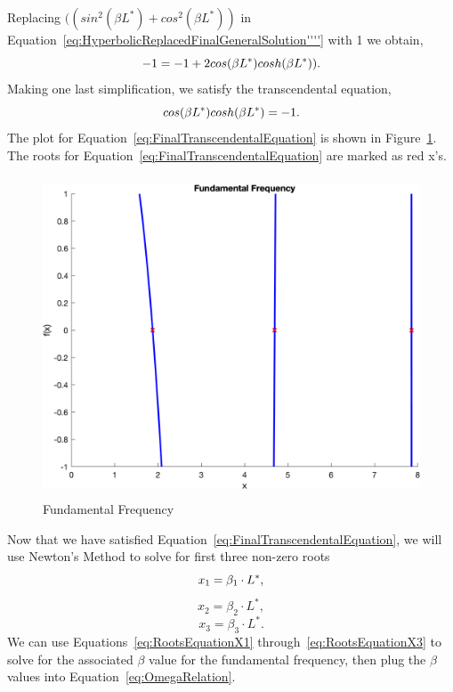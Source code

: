 \documentclass[12pt]{article}
\begin{document}
Replacing $((sin^2(\beta L^*)+cos^2(\beta L^*))$ in Equation~\eqref{eq:HyperbolicReplacedFinalGeneralSolution''''} with 1 we obtain, 
\begin{equation}\label{eq:TrigonometricReplacedFinalGeneralSolution''''}
    \centering
    -1=-1+2cos(\beta L^*)cosh(\beta L^*)).
\end{equation}
Making one last simplification, we satisfy the transcendental equation,
\begin{equation}\label{eq:FinalTranscendentalEquation}
    \centering
    cos(\beta L^*)cosh(\beta L^*)=-1.
\end{equation}
The plot for Equation~\eqref{eq:FinalTranscendentalEquation} is shown in Figure~\ref{FundamentalFrequency}. The roots for Equation~\eqref{eq:FinalTranscendentalEquation} are marked as red x's. 
\begin{figure}[H]
\centering
\includegraphics[height= 9.5cm, width= 12.5cm]{curve_Fundamenal_Frequency.png}
\caption{Fundamental Frequency}
\label{FundamentalFrequency}
\end{figure}
Now that we have satisfied Equation~\eqref{eq:FinalTranscendentalEquation}, we will use Newton's Method to solve for first three non-zero roots
\begin{equation}\label{eq:RootsEquationX1}
    \centering
    x_1=\beta_1\cdot L^*,
\end{equation}
\begin{equation}\label{eq:RootsEquationX2}
    x_2=\beta_2\cdot L^*,
\end{equation}
\begin{equation}\label{eq:RootsEquationX3}
    x_3=\beta_3\cdot L^*.
\end{equation}
We can use Equations~\eqref{eq:RootsEquationX1} through~\eqref{eq:RootsEquationX3} to solve for the associated $\beta$ value for the fundamental frequency, then plug the $\beta$ values into Equation~\eqref{eq:OmegaRelation}.
\end{document}
